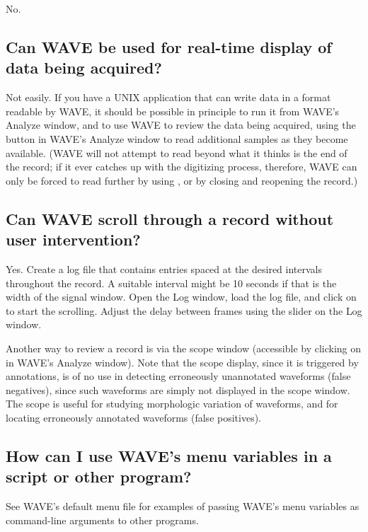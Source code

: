 \documentclass[twoside]{book}
\newcommand{\button}[1]{\cornersize{2}\ovalbox{\rule[-.3mm]{0cm}{2.5mm}\small\sf ~#1~}}
\newcommand{\WAVE}{{\sf WAVE}\xspace}
\begin{document}
No.

\subsection{Can \WAVE{} be used for real-time display of data being acquired?}

Not easily.  If you have a UNIX application that can write data in a
format readable by \WAVE{}, it should be possible in principle to run it
from \WAVE{}'s {\sf Analyze} window, and to use \WAVE{} to review the data
being acquired, using the \button{Reload} button in \WAVE{}'s {\sf
Analyze} window to read additional samples as they become available.
(\WAVE{} will not attempt to read beyond what it thinks is the end of the
record; if it ever catches up with the digitizing process, therefore,
\WAVE{} can only be forced to read further by using \button{Reload},
or by closing and reopening the record.)

\subsection{Can \WAVE{} scroll through a record without user intervention?}

\label{sec:autoscroll}
Yes.  Create a log file that contains entries spaced at the desired
intervals throughout the record.  A suitable interval might be 10
seconds if that is the width of the signal window.  Open the {\sf Log}
window, load the log file, and click on \button{\tt >>} to start the
scrolling.  Adjust the delay between frames using the slider on the
{\sf Log} window.

Another way to review a record is via the scope window (accessible by
clicking on \button{Show scope window} in \WAVE{}'s {\sf Analyze}
window).  Note that the scope display, since it is triggered by
annotations, is of no use in detecting erroneously unannotated
waveforms (false negatives), since such waveforms are simply not
displayed in the scope window.  The scope is useful for studying
morphologic variation of waveforms, and for locating erroneously
annotated waveforms (false positives).

\subsection{How can I use \WAVE{}'s menu variables in a script or other program?}

See \WAVE{}'s default menu file for examples of passing \WAVE{}'s menu
variables as command-line arguments to other programs.
\end{document}

